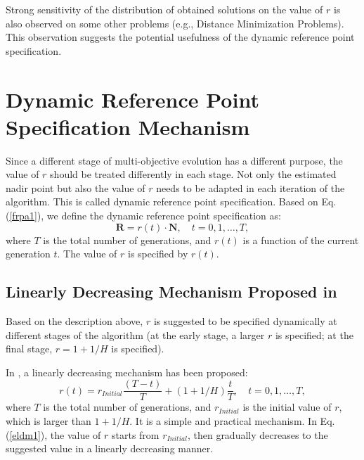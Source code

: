 \documentclass[conference]{IEEEtran}
\begin{document}
Strong sensitivity of the distribution of obtained solutions on the value of $r$ is also observed on some other problems 
(e.g., Distance Minimization Problems\cite{dmp}). 
This observation suggests the potential usefulness of the dynamic reference point specification\cite{hisao:dynamic}.

\section{Dynamic Reference Point Specification Mechanism}
Since a different stage of multi-objective evolution has a different purpose, the value of $r$ should be treated differently in each stage\cite{hisao:dynamic}. 
Not only the estimated nadir point but also the value of $r$ 
needs to be adapted in each iteration of the algorithm. 
This is called dynamic reference point specification. 
Based on Eq. (\ref{frpa1}), 
we define the dynamic reference point specification as:
\begin{equation}\label{f2}
  \boldsymbol R = r(t) \cdot \boldsymbol N, \quad
  t=0,1,\dots,T,
\end{equation}
where $T$ is the total number of generations, and $r(t)$ is a function of the current generation $t$.
The value of $r$ is specified by $r(t)$. 


% 
\subsection{Linearly Decreasing Mechanism Proposed in \cite{hisao:dynamic}} 
Based on the description above, $r$ is suggested to be specified dynamically at different stages of
the algorithm (at the early stage, a larger $r$ is specified; at the final stage, $r=1+1/H$ is specified).

In \cite{hisao:dynamic}, a linearly decreasing mechanism has been proposed:
\begin{equation}\label{eldm1}
  r(t)=r_{Initial}\frac{(T-t)}{T}+(1+1/H)\frac{t}{T}, \quad t=0,1,\dots,T,
\end{equation}
where $T$ is the total number of generations, and $r_{Initial}$ is the initial value of $r$,
which is larger than $1+1/H$. 
It is a simple and practical mechanism. In Eq. (\ref{eldm1}), the value of $r$ starts from $r_{Initial}$,
then gradually decreases to the suggested value in a linearly decreasing manner. 
\end{document}
